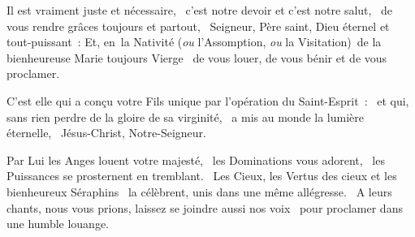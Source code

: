 Il est vraiment juste et nécessaire, 
c’est notre devoir et c’est notre salut, 
de vous rendre grâces toujours et partout, 
Seigneur, Père saint, Dieu éternel et tout-puissant :
Et, en la Nativité (\emph{ou} l'Assomption, \emph{ou} la Visitation) de la bienheureuse Marie toujours Vierge 
de vous louer, de vous bénir et de vous proclamer. 

C’est elle qui a conçu votre Fils unique par l’opération du Saint-Esprit : 
et qui, sans rien perdre de la gloire de sa virginité, 
a mis au monde la lumière éternelle, 
Jésus-Christ, Notre-Seigneur.

Par Lui les Anges louent votre majesté, 
les Dominations vous adorent, 
les Puissances se prosternent en tremblant. 
Les Cieux, les Vertus des cieux et les bienheureux Séraphins 
la célèbrent, unis dans une même allégresse. 
A leurs chants, nous vous prions, laissez se joindre aussi nos voix 
pour proclamer dans une humble louange.
